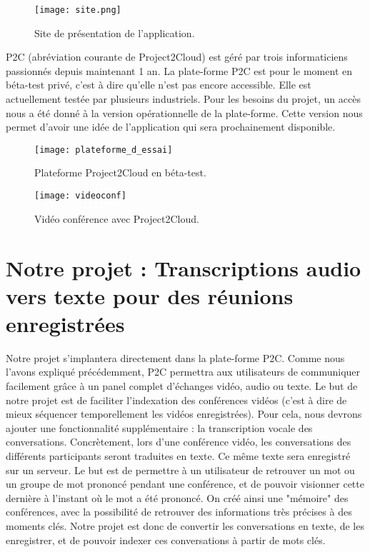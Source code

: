			\begin{figure}[H] 
				\begin{center}
					\texttt{[image: site.png]}
					\caption{Site de présentation de l'application.}			
				\end{center}
			\end{figure}

	P2C (abréviation courante de Project2Cloud) est géré par trois informaticiens passionnés depuis maintenant 1 an. La plate-forme P2C est pour le moment en béta-test privé, c'est à dire qu'elle n'est pas encore accessible. Elle est actuellement testée par plusieurs industriels. Pour les besoins du projet, un accès nous a été donné à la version opérationnelle de la plate-forme. Cette version nous permet d'avoir une idée de l'application qui sera prochainement disponible. 

			\begin{figure}[H] 
				\begin{center}
					\texttt{[image: plateforme\_d\_essai]}
					\caption{Plateforme Project2Cloud en béta-test.}			
				\end{center}
			\end{figure}
			
			\begin{figure}[H] 
				\begin{center}
					\texttt{[image: videoconf]}
					\caption{Vidéo conférence avec Project2Cloud.}			
				\end{center}
			\end{figure}


	\section{Notre projet : Transcriptions audio vers texte pour des réunions enregistrées}
	Notre projet s'implantera directement dans la plate-forme P2C. Comme nous l'avons expliqué précédemment, P2C permettra aux utilisateurs de communiquer facilement grâce à un panel complet d'échanges vidéo, audio ou texte. Le but de notre projet est de faciliter l'indexation des conférences vidéos (c'est à dire de mieux séquencer temporellement les vidéos enregistrées). Pour cela, nous devrons ajouter une fonctionnalité supplémentaire : la transcription vocale des conversations. Concrètement, lors d'une conférence vidéo, les conversations des différents participants seront traduites en texte. Ce même texte sera enregistré sur un serveur. Le but est de permettre à un utilisateur de retrouver un mot ou un groupe de mot prononcé pendant une conférence, et de pouvoir visionner cette dernière à l'instant où le mot a été prononcé. On créé ainsi une "mémoire" des conférences, avec la possibilité de retrouver des informations très précises à des moments clés. 
	Notre projet est donc de convertir les conversations en texte, de les enregistrer, et de pouvoir indexer ces conversations à partir de mots clés. 

